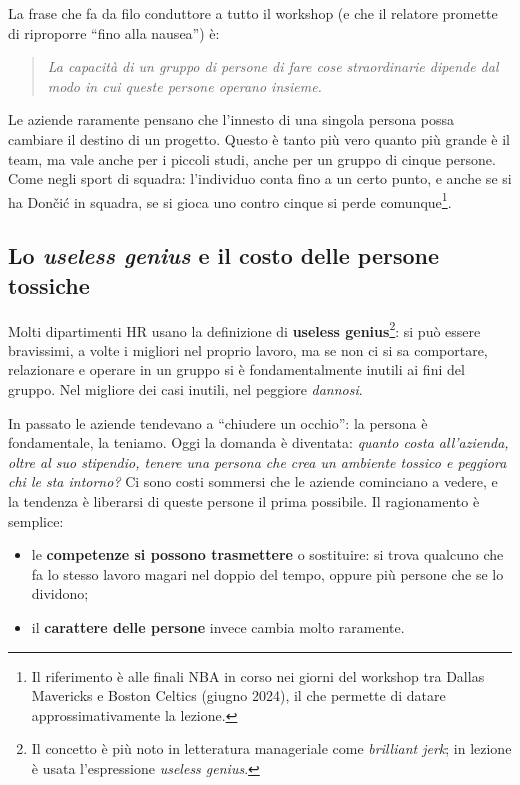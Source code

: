 La frase che fa da filo conduttore a tutto il workshop (e che il relatore
promette di riproporre ``fino alla nausea'') è:

\begin{quote}
  \emph{La capacità di un gruppo di persone di fare cose straordinarie
  dipende dal modo in cui queste persone operano insieme.}
\end{quote}

Le aziende raramente pensano che l'innesto di una singola persona possa
cambiare il destino di un progetto. Questo è tanto più vero quanto più grande
è il team, ma vale anche per i piccoli studi, anche per un gruppo di cinque
persone. Come negli sport di squadra: l'individuo conta fino a un certo punto,
e anche se si ha Dončić in squadra, se si gioca uno contro cinque si perde
comunque\footnote{Il riferimento è alle finali NBA in corso nei giorni del
workshop tra Dallas Mavericks e Boston Celtics (giugno 2024), il che
permette di datare approssimativamente la lezione.}.

\subsection{Lo \emph{useless genius} e il costo delle persone tossiche}

Molti dipartimenti HR usano la definizione di \textbf{useless
genius}\footnote{Il concetto è più noto in letteratura manageriale come
\emph{brilliant jerk}; in lezione è usata l'espressione \emph{useless
genius}.}: si può essere bravissimi, a volte i migliori nel proprio lavoro,
ma se non ci si sa comportare, relazionare e operare in un gruppo si è
fondamentalmente inutili ai fini del gruppo. Nel migliore dei casi inutili,
nel peggiore \emph{dannosi}.

In passato le aziende tendevano a ``chiudere un occhio'': la persona è
fondamentale, la teniamo. Oggi la domanda è diventata: \emph{quanto costa
all'azienda, oltre al suo stipendio, tenere una persona che crea un ambiente
tossico e peggiora chi le sta intorno?} Ci sono costi sommersi che le aziende
cominciano a vedere, e la tendenza è liberarsi di queste persone il prima
possibile. Il ragionamento è semplice:
\begin{itemize}
  \item le \textbf{competenze si possono trasmettere} o sostituire: si trova
        qualcuno che fa lo stesso lavoro magari nel doppio del tempo, oppure
        più persone che se lo dividono;
  \item il \textbf{carattere delle persone} invece cambia molto raramente.
\end{itemize}

